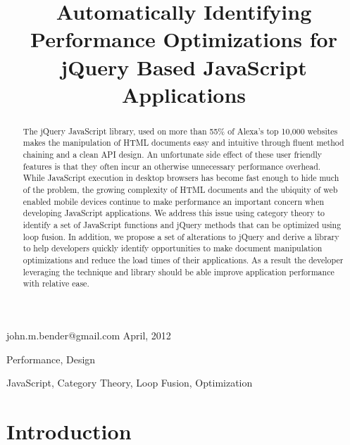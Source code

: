 \documentclass[preprint]{sigplanconf}
\begin{document}
\copyrightdata{[to be supplied]}


\title{Automatically Identifying Performance Optimizations for jQuery Based JavaScript Applications}

           {john.m.bender@gmail.com}
           {April, 2012}

\maketitle

\begin{abstract}
The jQuery JavaScript library, used on more than 55\% of Alexa's top 10,000 websites \cite{bib:usage} makes the manipulation of HTML documents easy and intuitive through fluent method chaining and a clean API design. An unfortunate side effect of these user friendly features is that they often incur an otherwise unnecessary performance overhead. While JavaScript execution in desktop browsers has become fast enough to hide much of the problem, the growing complexity of HTML documents and the ubiquity of web enabled mobile devices continue to make performance an important concern when developing JavaScript applications. We address this issue using category theory to identify a set of JavaScript functions and jQuery methods that can be optimized using loop fusion. In addition, we propose a set of alterations to jQuery and derive a library to help developers quickly identify opportunities to make document manipulation optimizations and reduce the load times of their applications. As a result the developer leveraging the technique and library should be able improve application performance with relative ease.
\end{abstract}


\terms
Performance, Design

\keywords
JavaScript, Category Theory, Loop Fusion, Optimization

\section{Introduction}
\end{document}
